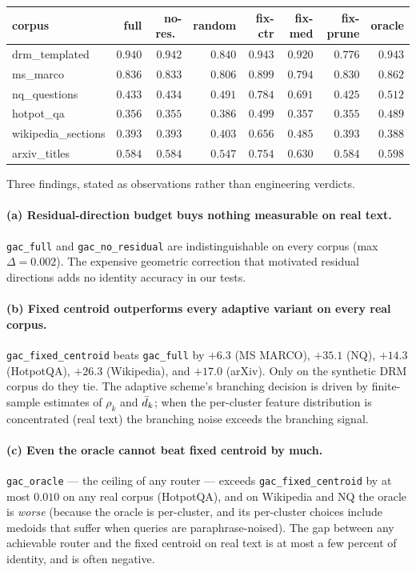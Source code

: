 \begin{center}
\small
\begin{tabular}{lrrrrrrr}
\toprule
corpus & full & no-res.\ & random & fix-ctr & fix-med & fix-prune & oracle \\
\midrule
drm\_templated      & $0.940$ & $0.942$ & $0.840$ & $0.943$ & $0.920$ & $0.776$ & $0.943$ \\
ms\_marco           & $0.836$ & $0.833$ & $0.806$ & $0.899$ & $0.794$ & $0.830$ & $0.862$ \\
nq\_questions       & $0.433$ & $0.434$ & $0.491$ & $0.784$ & $0.691$ & $0.425$ & $0.512$ \\
hotpot\_qa          & $0.356$ & $0.355$ & $0.386$ & $0.499$ & $0.357$ & $0.355$ & $0.489$ \\
wikipedia\_sections & $0.393$ & $0.393$ & $0.403$ & $0.656$ & $0.485$ & $0.393$ & $0.388$ \\
arxiv\_titles       & $0.584$ & $0.584$ & $0.547$ & $0.754$ & $0.630$ & $0.584$ & $0.598$ \\
\bottomrule
\end{tabular}
\end{center}

Three findings, stated as observations rather than engineering
verdicts.

\paragraph{(a) Residual-direction budget buys nothing measurable on
real text.} \texttt{gac\_full} and \texttt{gac\_no\_residual} are
indistinguishable on every corpus (max $\Delta = 0.002$). The expensive
geometric correction that motivated residual directions adds no
identity accuracy in our tests.

\paragraph{(b) Fixed centroid outperforms every adaptive variant on
every real corpus.} \texttt{gac\_fixed\_centroid} beats
\texttt{gac\_full} by $+6.3$ (MS MARCO), $+35.1$ (NQ), $+14.3$
(HotpotQA), $+26.3$ (Wikipedia), and $+17.0$ (arXiv). Only on the
synthetic DRM corpus do they tie. The adaptive scheme's branching
decision is driven by finite-sample estimates of $\rho_k$ and
$\bar{d}_k$; when the per-cluster feature distribution is concentrated
(real text) the branching noise exceeds the branching signal.

\paragraph{(c) Even the oracle cannot beat fixed centroid by much.}
\texttt{gac\_oracle} --- the ceiling of any router --- exceeds
\texttt{gac\_fixed\_centroid} by at most $0.010$ on any real corpus
(HotpotQA), and on Wikipedia and NQ the oracle is \emph{worse}
(because the oracle is per-cluster, and its per-cluster choices
include medoids that suffer when queries are paraphrase-noised).
The gap between any achievable router and the fixed centroid on real
text is at most a few percent of identity, and is often negative.

